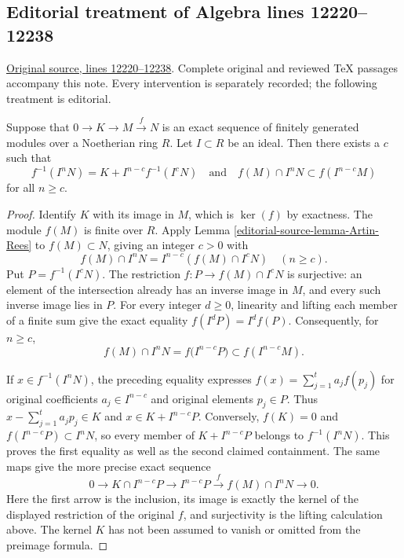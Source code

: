 \subsection{Editorial treatment of Algebra lines 12220--12238}

\hypertarget{algebra-context-160}{}

\noindent\href{https://github.com/stacks/stacks-project/blob/a04446e57ec1fbc252a871afcec7752fb2807b14/algebra.tex\#L12220}{Original source, lines 12220--12238}. Complete original and reviewed TeX passages accompany this note. Every intervention is separately recorded; the following treatment is editorial.


\begin{lemma}
\label{editorial-source-lemma-map-AR}
Suppose that $0 \to K \to M \xrightarrow{f} N$ is an
exact sequence of finitely generated modules
over a Noetherian ring $R$. Let $I \subset R$ be an ideal.
Then there exists a $c$ such that
$$
f^{-1}(I^nN) = K + I^{n-c}f^{-1}(I^cN)
\quad\text{and}\quad
f(M) \cap I^nN \subset f(I^{n - c}M)
$$
for all $n \geq c$.
\end{lemma}

\begin{proof}
Identify $K$ with its image in $M$, which is $\ker(f)$ by
exactness. The module $f(M)$ is finite over $R$.
Apply Lemma \ref{editorial-source-lemma-Artin-Rees} to $f(M)\subset N$, giving
an integer $c>0$ with
$$
f(M)\cap I^nN=I^{n-c}(f(M)\cap I^cN)\quad(n\geq c).
$$
Put $P=f^{-1}(I^cN)$. The restriction $f:P\to f(M)\cap I^cN$
is surjective: an element of the intersection already has an
inverse image in $M$, and every such inverse image lies in $P$.
For every integer $d\geq0$, linearity and lifting each member
of a finite sum give the exact equality
$f(I^dP)=I^d f(P)$.
Consequently, for $n\geq c$,
$$
f(M)\cap I^nN
=f\bigl(I^{n-c}P\bigr)
\subset f(I^{n-c}M).
$$

If $x\in f^{-1}(I^nN)$, the preceding equality expresses
$f(x)=\sum_{j=1}^t a_jf(p_j)$ for original coefficients
$a_j\in I^{n-c}$ and original elements $p_j\in P$.
Thus $x-\sum_{j=1}^t a_jp_j\in K$ and
$x\in K+I^{n-c}P$. Conversely, $f(K)=0$ and
$f(I^{n-c}P)\subset I^nN$, so every member of
$K+I^{n-c}P$ belongs to $f^{-1}(I^nN)$. This proves the
first equality as well as the second claimed containment.
The same maps give the more precise exact sequence
$$
0\longrightarrow K\cap I^{n-c}P
\longrightarrow I^{n-c}P
\xrightarrow{\ f\ }f(M)\cap I^nN
\longrightarrow0.
$$
Here the first arrow is the inclusion, its image is exactly the
kernel of the displayed restriction of the original $f$, and
surjectivity is the lifting calculation above. The kernel $K$
has not been assumed to vanish or omitted from the preimage formula.
\end{proof}


